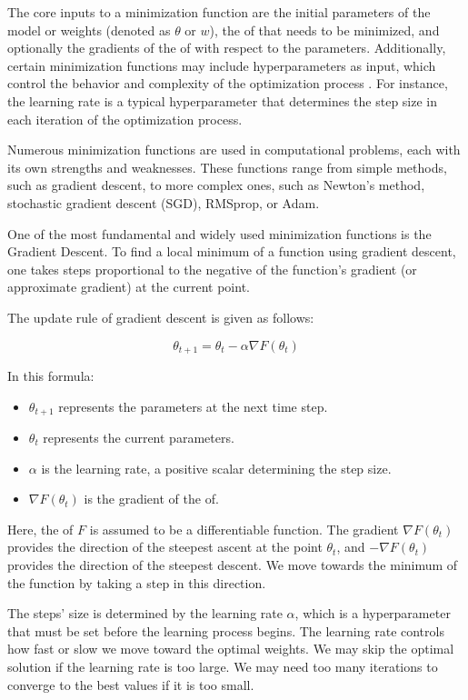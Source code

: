 \documentclass[
  a4paper,  %
  twoside,  %
  bibliography=totoc,
  headsepline,
  cleardoublepage=empty,
  parskip=half,
  draft=false
]{scrbook}
\begin{document}
The core inputs to a minimization function are the initial parameters of the model or weights (denoted as \(\theta\) or \(w\)),
the \gls{of} that needs to be minimized, and optionally the gradients of the \gls{of} with respect to the parameters.
Additionally, certain minimization functions may include hyperparameters as input, which control the behavior and complexity of the optimization process \cite{Virtanen2020}.
For instance, the learning rate is a typical hyperparameter that determines the step size in each iteration of the optimization process.

Numerous minimization functions are used in computational problems, each with its own strengths and weaknesses.
These functions range from simple methods, such as gradient descent, to more complex ones, such as Newton's method, stochastic gradient descent (SGD), RMSprop, or Adam.

One of the most fundamental and widely used minimization functions is the Gradient Descent.
To find a local minimum of a function using gradient descent, one takes steps proportional to the negative of the function's gradient (or approximate gradient) at the current point.

The update rule of gradient descent is given as follows:

\[
\theta_{t+1} = \theta_t - \alpha \nabla F(\theta_t)
\]

In this formula:

\begin{itemize}
  \item \(\theta_{t+1}\) represents the parameters at the next time step.
  \item \(\theta_t\) represents the current parameters.
  \item \(\alpha\) is the learning rate, a positive scalar determining the step size.
  \item \(\nabla F(\theta_t)\) is the gradient of the \gls{of}.
\end{itemize}

Here, the \gls{of} \(F\) is assumed to be a differentiable function.
The gradient \(\nabla F(\theta_t)\) provides the direction of the steepest ascent at the point \(\theta_t\), and \(-\nabla F(\theta_t)\) provides the direction of the steepest descent.
We move towards the minimum of the function by taking a step in this direction.

The steps' size is determined by the learning rate \(\alpha\), which is a hyperparameter that must be set before the learning process begins.
The learning rate controls how fast or slow we move toward the optimal weights.
We may skip the optimal solution if the learning rate is too large.
We may need too many iterations to converge to the best values if it is too small.
\end{document}
